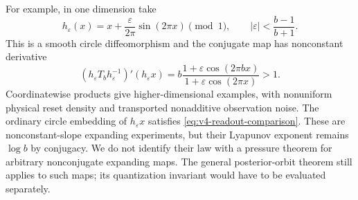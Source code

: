 For example, in one dimension take
\[
 h_\varepsilon(x)=x+\frac{\varepsilon}{2\pi}\sin(2\pi x)\pmod1,
 \qquad |\varepsilon|<\frac{b-1}{b+1}.
\]
This is a smooth circle diffeomorphism and the conjugate map has
nonconstant derivative
\[
 (h_\varepsilon T_bh_\varepsilon^{-1})'(h_\varepsilon x)
 =b\frac{1+\varepsilon\cos(2\pi bx)}{1+\varepsilon\cos(2\pi x)}>1.
\]
Coordinatewise products give higher-dimensional examples, with
nonuniform physical reset density and transported nonadditive
observation noise. The ordinary circle embedding of $h_\varepsilon x$
satisfies \eqref{eq:v4-readout-comparison}. These are nonconstant-slope
expanding experiments, but their Lyapunov exponent remains $\log b$
by conjugacy. We do not identify their law with a pressure theorem
for arbitrary nonconjugate expanding maps. The general posterior-orbit
theorem still applies to such maps; its quantization invariant would
have to be evaluated separately.
